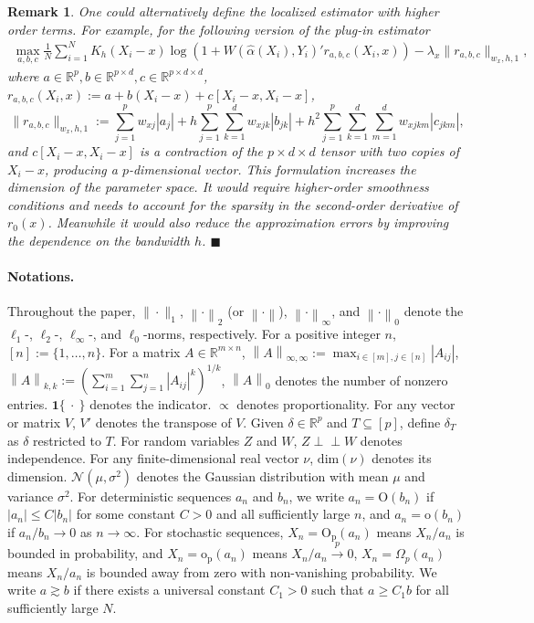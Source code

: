 \documentclass[11pt]{article}
\newtheorem{remark}{Remark}
\newcommand{\indep}{\perp\!\!\!\perp}
\newcommand{\norm}[1]{\left\lVert #1 \right\rVert}
\newcommand{\proofend}{\hfill$\blacksquare$}
\begin{document}
\begin{remark}\label{rmk:higher:order:approx}
One could alternatively define the localized estimator with higher order terms. For example, for the following version of the plug-in estimator
$$\begin{array}{rl}
\displaystyle\max_{a,b,c}\displaystyle\frac{1}{N} \sum_{i=1}^N  K_h\left( \mbox{$X_i-x$}\right)  \log( 1+W(\hat\alpha (X_i),Y_i)'r_{a,b,c }(X_i,x)  ) - \lambda_x \|r_{a,b,c}\|_{w_x,h,1}, 
\end{array}$$
where $a\in \mathbb{R}^p, b \in \mathbb{R}^{p\times d}, c \in \mathbb{R}^{p\times d\times d}$, $r_{a,b,c}(X_i,x):= a + b(X_i-x) + c[X_i-x,X_i-x]$,
$$\|r_{a,b,c}\|_{w_x,h,1} :=\sum_{j=1}^p w_{xj} |a_j| + h\sum_{j=1}^p\sum_{k=1}^d w_{xjk} |b_{jk}| + h^2\sum_{j=1}^p\sum_{k=1}^d\sum_{m=1}^d w_{xjkm} |c_{jkm}|,$$ 
and $c[X_i-x,X_i-x]$ is a contraction of the $p\times d\times d$ tensor with two copies of $X_i-x$, producing a $p$-dimensional vector. This formulation increases the dimension of the parameter space. It would require higher-order smoothness conditions and needs to account for the sparsity in the second-order derivative of $r_0(x)$. Meanwhile it would also reduce the approximation errors by improving the dependence on the bandwidth $h$. \proofend
\end{remark}

\paragraph{Notations.} Throughout the paper, $\|\cdot\|_1$, $\norm{\cdot}_2$ (or $\norm{\cdot}$), $\norm{\cdot}_\infty$, and $\norm{\cdot}_0$ denote the $\ell_1$-, $\ell_2$-, $\ell_\infty$-, and $\ell_0$-norms, respectively. For a positive integer $n$, $[n]:=\{1,\ldots,n\}$.
For a matrix $A\in\mathbb{R}^{m\times n}$, $\norm{A}_{\infty,\infty}:=\max_{i\in[m],j\in[n]}|A_{ij}|$, $\norm{A}_{k,k}:=(\sum_{i=1}^m\sum_{j=1}^n|A_{ij}|^k)^{1/k}$, $\norm{A}_0$ denotes the number of nonzero entries. $\mathbf{1}\{\ \cdot\ \}$ denotes the indicator. $\propto$ denotes proportionality. For any vector or matrix $V$, $V'$ denotes the transpose of $V$. Given $\delta\in\mathbb{R}^p$ and $T\subseteq[p]$, define $\delta_T$ as $\delta$ restricted to $T$. For random variables $Z$ and $W$, $Z\indep W$ denotes independence. For any finite-dimensional real vector $\nu$, $\mathrm{dim}(\nu)$ denotes its dimension. $\mathcal{N}(\mu,\sigma^2)$ denotes the Gaussian distribution with mean $\mu$ and variance $\sigma^2$. For deterministic sequences ${a_n}$ and ${b_n}$, we write $a_n = \mathrm{O}(b_n)$ if $|a_n| \le C |b_n|$ for some constant $C>0$ and all sufficiently large $n$, and $a_n = \mathrm{o}(b_n)$ if $a_n/b_n \to 0$ as $n \to \infty$. For stochastic sequences, $X_n = \mathrm{O}_{\mathrm{p}}(a_n)$ means $X_n/a_n$ is bounded in probability, and $X_n = \mathrm{o}_{\mathrm{p}}(a_n)$ means $X_n/a_n \xrightarrow{p} 0$, $X_n=\Omega_p(a_n)$ means $X_n/a_n$ is bounded away from zero with non-vanishing probability. We write $a \gtrsim b$ if there exists a universal constant $C_1>0$ such that 
$a \ge C_1 b$ for all sufficiently large $N$.  
\end{document}
